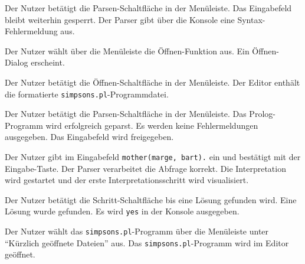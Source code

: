 \documentclass[parskip=full,11pt,twoside]{scrartcl}
\begin{document}
{Der Nutzer betätigt die Parsen-Schaltfläche in der Menüleiste.}
{Das Eingabefeld bleibt weiterhin gesperrt. Der Parser gibt über die Konsole eine Syntax-Fehlermeldung aus.}


{Der Nutzer wählt über die Menüleiste die Öffnen-Funktion aus.}
{Ein Öffnen-Dialog erscheint.}

{Der Nutzer betätigt die Öffnen-Schaltfläche in der Menüleiste.}
{Der Editor enthält die formatierte \texttt{simpsons.pl}-Programmdatei.}

{Der Nutzer betätigt die Parsen-Schaltfläche in der Menüleiste.}
{Das Prolog-Programm wird erfolgreich geparst. Es werden keine Fehlermeldungen ausgegeben. Das Eingabefeld wird freigegeben.}

{Der Nutzer gibt im Eingabefeld \texttt{mother(marge, bart).} ein und bestätigt mit der Eingabe-Taste.}
{Der Parser verarbeitet die Abfrage korrekt. Die Interpretation wird gestartet und der erste Interpretationsschritt wird visualisiert.}

{Der Nutzer betätigt die Schritt-Schaltfläche bis eine Lösung gefunden wird.}
{Eine Lösung wurde gefunden. Es wird \texttt{yes} in der Konsole ausgegeben.}


{Der Nutzer wählt das \texttt{simpsons.pl}-Programm über die Menüleiste unter \enquote{Kürzlich geöffnete Dateien} aus.}
{Das \texttt{simpsons.pl}-Programm wird im Editor geöffnet.}
\end{document}
